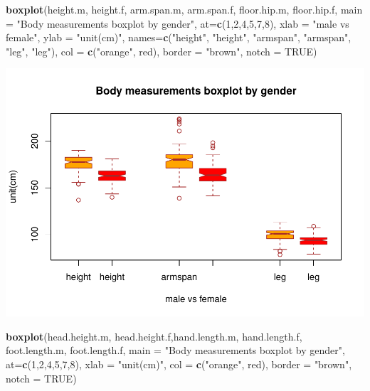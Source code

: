 \documentclass[]{article}
\newenvironment{Shaded}{\begin{snugshade}}{\end{snugshade}}
\newcommand{\DataTypeTok}[1]{\textcolor[rgb]{0.13,0.29,0.53}{#1}}
\newcommand{\DecValTok}[1]{\textcolor[rgb]{0.00,0.00,0.81}{#1}}
\newcommand{\KeywordTok}[1]{\textcolor[rgb]{0.13,0.29,0.53}{\textbf{#1}}}
\newcommand{\NormalTok}[1]{#1}
\newcommand{\OtherTok}[1]{\textcolor[rgb]{0.56,0.35,0.01}{#1}}
\newcommand{\StringTok}[1]{\textcolor[rgb]{0.31,0.60,0.02}{#1}}
\begin{document}
\begin{Shaded}
\begin{Highlighting}[]
\KeywordTok{boxplot}\NormalTok{(height.m, height.f, arm.span.m, arm.span.f, floor.hip.m, floor.hip.f, }
\DataTypeTok{main =} \StringTok{"Body measurements boxplot by gender"}\NormalTok{,}
\DataTypeTok{at=}\KeywordTok{c}\NormalTok{(}\DecValTok{1}\NormalTok{,}\DecValTok{2}\NormalTok{,}\DecValTok{4}\NormalTok{,}\DecValTok{5}\NormalTok{,}\DecValTok{7}\NormalTok{,}\DecValTok{8}\NormalTok{),}
\DataTypeTok{xlab =} \StringTok{"male vs female"}\NormalTok{,}
\DataTypeTok{ylab =} \StringTok{"unit(cm)"}\NormalTok{,}
\DataTypeTok{names=}\KeywordTok{c}\NormalTok{(}\StringTok{"height"}\NormalTok{, }\StringTok{"height"}\NormalTok{, }\StringTok{"armspan"}\NormalTok{, }\StringTok{"armspan"}\NormalTok{, }\StringTok{"leg"}\NormalTok{, }\StringTok{"leg"}\NormalTok{),}
\DataTypeTok{col =} \KeywordTok{c}\NormalTok{(}\StringTok{"orange"}\NormalTok{, }\StringTok{\textquotesingle{}red\textquotesingle{}}\NormalTok{),}
\DataTypeTok{border =} \StringTok{"brown"}\NormalTok{,}
\DataTypeTok{notch =} \OtherTok{TRUE}\NormalTok{)}
\end{Highlighting}
\end{Shaded}

\includegraphics{project-measure_files/figure-latex/box_plots-1.pdf}

\begin{Shaded}
\begin{Highlighting}[]
\KeywordTok{boxplot}\NormalTok{(head.height.m, head.height.f,hand.length.m, hand.length.f, foot.length.m, foot.length.f,}
\DataTypeTok{main =} \StringTok{"Body measurements boxplot by gender"}\NormalTok{,}
\DataTypeTok{at=}\KeywordTok{c}\NormalTok{(}\DecValTok{1}\NormalTok{,}\DecValTok{2}\NormalTok{,}\DecValTok{4}\NormalTok{,}\DecValTok{5}\NormalTok{,}\DecValTok{7}\NormalTok{,}\DecValTok{8}\NormalTok{),}
\DataTypeTok{xlab =} \StringTok{"unit(cm)"}\NormalTok{,}
\DataTypeTok{col =} \KeywordTok{c}\NormalTok{(}\StringTok{"orange"}\NormalTok{, }\StringTok{\textquotesingle{}red\textquotesingle{}}\NormalTok{),}
\DataTypeTok{border =} \StringTok{"brown"}\NormalTok{,}
\DataTypeTok{notch =} \OtherTok{TRUE}\NormalTok{)}
\end{Highlighting}
\end{Shaded}
\end{document}

